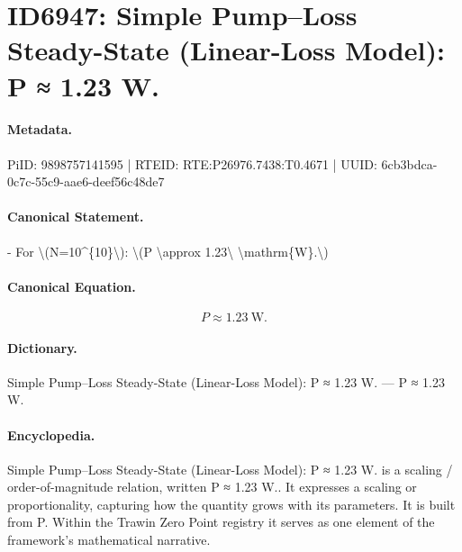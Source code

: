 \section*{ID6947: Simple Pump–Loss Steady-State (Linear-Loss Model): P ≈ 1.23 W.}
\paragraph{Metadata.}
PiID: 9898757141595 | RTEID: RTE:P26976.7438:T0.4671 | UUID: 6cb3bdca-0c7c-55c9-aae6-deef56c48de7

\paragraph{Canonical Statement.}
- For \textbackslash{}(N=10\textasciicircum{}\{10\}\textbackslash{}): \textbackslash{}(P \textbackslash{}approx 1.23\textbackslash{} \textbackslash{}mathrm\{W\}.\textbackslash{})

\paragraph{Canonical Equation.}
\[
P \approx 1.23\ \mathrm{W}.
\]

\paragraph{Dictionary.}
Simple Pump–Loss Steady-State (Linear-Loss Model): P ≈ 1.23 W. — P ≈ 1.23 W.

\paragraph{Encyclopedia.}
Simple Pump–Loss Steady-State (Linear-Loss Model): P ≈ 1.23 W. is a scaling / order-of-magnitude relation, written P ≈ 1.23 W.. It expresses a scaling or proportionality, capturing how the quantity grows with its parameters. It is built from P. Within the Trawin Zero Point registry it serves as one element of the framework's mathematical narrative.
